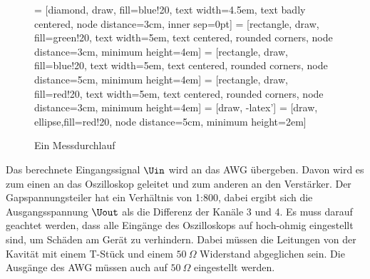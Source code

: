 \documentclass[../Report.tex]{subfiles}
\begin{document}
\begin{figure}[H]
\centering

 = [diamond, draw, fill=blue!20, 
    text width=4.5em, text badly centered, node distance=3cm, inner sep=0pt]
 = [rectangle, draw, fill=green!20, 
    text width=5em, text centered, rounded corners, node distance=3cm, minimum height=4em]
 = [rectangle, draw, fill=blue!20, 
    text width=5em, text centered, rounded corners, node distance=5cm, minimum height=4em]
 = [rectangle, draw, fill=red!20, 
    text width=5em, text centered, rounded corners, node distance=3cm, minimum height=4em]
 = [draw, -latex']
 = [draw, ellipse,fill=red!20, node distance=5cm,
    minimum height=2em]
    
\caption{Ein Messdurchlauf}
  	\label{fig:Messung}
\end{figure}

\noindent
Das berechnete Eingangssignal $\Uin$ wird an das AWG übergeben. Davon wird es zum einen an das Oszilloskop geleitet und zum anderen an den Verstärker. Der Gapspannungsteiler hat ein Verhältnis von 1:800, dabei ergibt sich die Ausgangsspannung $\Uout$ als die Differenz der Kanäle 3 und 4. Es muss darauf geachtet werden, dass alle Eingänge des Oszilloskops auf hoch-ohmig eingestellt sind, um Schäden am Gerät zu verhindern. Dabei müssen die Leitungen von der Kavität mit einem T-Stück und einem $\SI{50}{\Omega}$ Widerstand abgeglichen sein. Die Ausgänge des AWG müssen auch auf $\SI{50}{\Omega}$ eingestellt werden.
\end{document}
